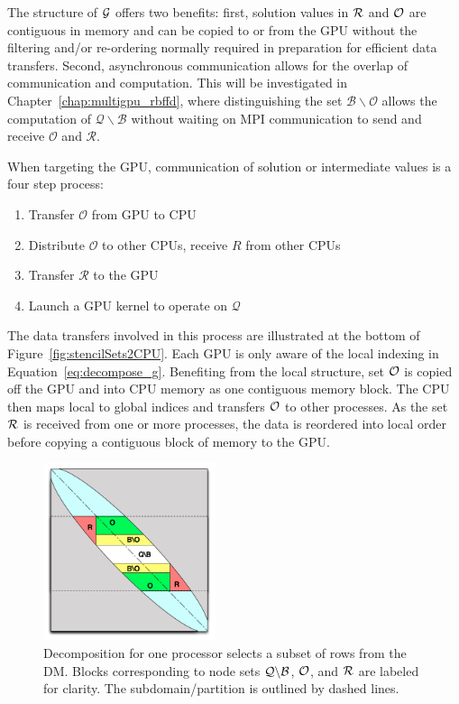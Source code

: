 \documentclass{report}
\begin{document}
 The structure of $\mathcal{G}$ offers two benefits: first, solution values in $\mathcal{R}$ and $\mathcal{O}$ are contiguous in memory and can be copied to or from the GPU without the filtering and/or re-ordering normally required in preparation for efficient data transfers. Second, asynchronous communication allows for the overlap of communication and computation. This will be investigated in Chapter~\ref{chap:multigpu_rbffd}, where distinguishing the set $\mathcal{B} \backslash \mathcal{O}$ allows the computation of $\mathcal{Q}\backslash \mathcal{B}$ without waiting on MPI communication to send and receive $\mathcal{O}$ and $\mathcal{R}$. 

When targeting the GPU, communication of solution or intermediate values is a four step process:
   \begin{enumerate}
    \item Transfer $\mathcal{O}$ from GPU to CPU
	\item Distribute $\mathcal{O}$ to other CPUs, receive $R$ from other CPUs
	\item Transfer $\mathcal{R}$ to the GPU
	\item Launch a GPU kernel to operate on $\mathcal{Q}$
   \end{enumerate} 
The data transfers involved in this process are illustrated at the bottom of Figure~\ref{fig:stencilSets2CPU}.
    Each GPU is only aware of the local indexing in Equation~\ref{eq:decompose_g}. Benefiting from the local structure, set 
$\mathcal{O}$ is copied off the GPU and into CPU memory as one contiguous memory block. The CPU then maps local to global indices and transfers $\mathcal{O}$ to other processes. As the set $\mathcal{R}$ is received from one or more processes, the data is reordered into local order before copying a contiguous block of memory to the GPU. 


\begin{figure}
\begin{center}
\includegraphics[width=0.45\textwidth]{rbffd_methods_content/decompositions/MatrixDecompositionSets_RBF-FD_Bowed.pdf} 
\caption{Decomposition for one processor selects a subset of rows from the DM. Blocks corresponding to node sets $\mathcal{Q} \backslash \mathcal{B}$, $\mathcal{O}$, and $\mathcal{R}$ are labeled for clarity. The subdomain/partition is outlined by dashed lines.}
\label{fig:decomp_matrix_view}
\end{center}
\end{figure}
\end{document}
